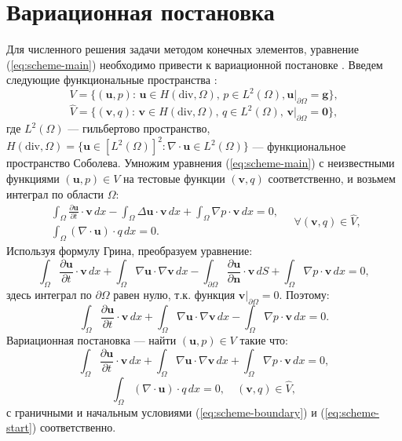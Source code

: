 \documentclass[12pt]{article}
\begin{document}
\section{Вариационная постановка}
Для численного решения задачи методом конечных элементов, уравнение (\ref{eq:scheme-main}) необходимо привести к вариационной постановке \cite{fenicsbook-2012}. Введем следующие функциональные пространства \cite{guzman-2011}:
$$
V=\{ ({\bm u}, p) : \, {\bm u} \in H(\mathrm{div}, \Omega), \, p \in L^2(\Omega),  {\bm u}|_{\partial \Omega}= {\bm g} \},
$$
$$
\hat V=\{ ({\bm v}, q) : \, {\bm v} \in H(\mathrm{div}, \Omega), \, q \in L^2(\Omega), \, {\bm v}|_{\partial \Omega}={\bm 0} \},
$$
где $L^2(\Omega)$ --- гильбертово пространство, $H(\mathrm{div}, \Omega) = \{{\bm u} \in [L^2(\Omega)]^2 : \nabla\cdot {\bm u} \in L^2(\Omega)\}$ --- функциональное пространство Соболева.
Умножим уравнения (\ref{eq:scheme-main}) с неизвестными функциями $({\bm u}, p) \in V$  на тестовые функции $({\bm v}, q)$ соответственно, и возьмем интеграл по области $\Omega$:
$$
\begin{aligned}
\int_{\Omega} \frac{\partial {\bm u}}{\partial t} \cdot {\bm v} \,dx - \int_{\Omega} \Delta {\bm u} \cdot {\bm v} \,dx + \int_{\Omega} \nabla p \cdot {\bm v} \,dx = 0, \\
\int_{\Omega} (\nabla \cdot {\bm u}) \cdot q \,dx = 0.
\end{aligned}
\quad \forall ({\bm v},q) \in \hat V,
$$
Используя формулу Грина, преобразуем уравнение:
$$
\int_{\Omega} \frac{\partial {\bm u}}{\partial t} \cdot {\bm v} \,dx + \int_{\Omega} \nabla {\bm u} \cdot \nabla {\bm v} \,dx - \int_{\partial \Omega} \frac{\partial {\bm u}}{\partial {\bm n}} \cdot {\bm v} \,dS + \int_{\Omega} \nabla p \cdot {\bm v} \,dx = 0,
$$
здесь интеграл по $\partial \Omega$ равен нулю, т.к. функция ${\bm v} | _ {\partial \Omega} = 0$. Поэтому:
$$
\int_{\Omega} \frac{\partial {\bm u}}{\partial t} \cdot {\bm v} \,dx + \int_{\Omega} \nabla {\bm u} \cdot \nabla {\bm v} \,dx - \int_{\Omega} \nabla p \cdot {\bm v} \,dx = 0.
$$
Вариационная постановка --- найти $({\bm u}, p) \in V$ такие что:
$$
\int_{\Omega} \frac{\partial {\bm u}}{\partial t} \cdot {\bm v} \,dx + \int_{\Omega} \nabla {\bm u} \cdot \nabla {\bm v} \,dx + \int_{\Omega} \nabla p \cdot {\bm v} \,dx = 0, 
$$
$$
\int_{\Omega} (\nabla \cdot {\bm u}) \cdot q \,dx = 0, \quad ({\bm v}, q) \in \hat V,
$$
с граничными и начальным условиями (\ref{eq:scheme-boundary}) и (\ref{eq:scheme-start}) соответственно.
\end{document}
